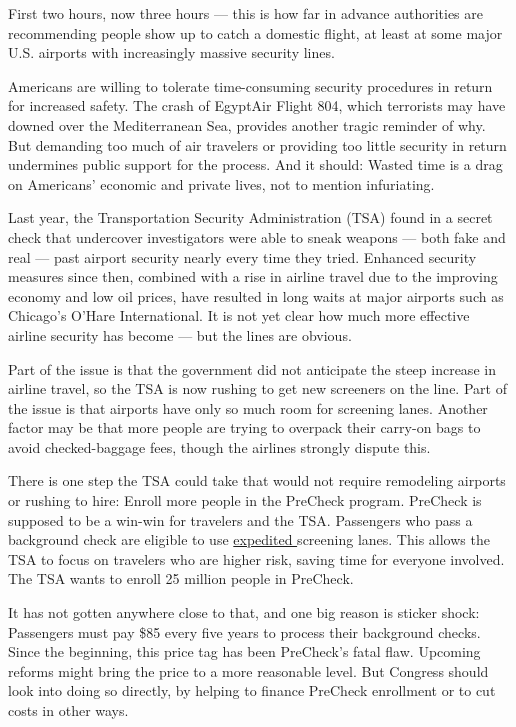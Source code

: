 \documentclass[UTF8,11pt]{ctexart}
\begin{document}
First two hours, now three hours — this is how far in advance authorities are recommending people show up to catch a domestic flight, at least at some major U.S. airports with increasingly massive security lines.


Americans are willing to tolerate time-consuming security procedures in return for increased safety. The crash of EgyptAir Flight 804, which terrorists may have downed over the Mediterranean Sea, provides another tragic reminder of why. But demanding too much of air travelers or providing too little security in return undermines public support for the process. And it should: Wasted time is a drag on Americans’ economic and private lives, not to mention infuriating.


Last year, the Transportation Security Administration (TSA) found in a secret check that undercover investigators were able to sneak weapons — both fake and real — past airport security nearly every time they tried. Enhanced security measures since then, combined with a rise in airline travel due to the improving economy and low oil prices, have resulted in long waits at major airports such as Chicago’s O’Hare International. It is not yet clear how much more effective airline security has become — but the lines are obvious.


Part of the issue is that the government did not anticipate the steep increase in airline travel, so the TSA is now rushing to get new screeners on the line. Part of the issue is that airports have only so much room for screening lanes. Another factor may be that more people are trying to overpack their carry-on bags to avoid checked-baggage fees, though the airlines strongly dispute this.


There is one step the TSA could take that would not require remodeling airports or rushing to hire: Enroll more people in the PreCheck program. PreCheck is supposed to be a win-win for travelers and the TSA. Passengers who pass a background check are eligible to use \uline{expedited }screening lanes. This allows the TSA to focus on travelers who are higher risk, saving time for everyone involved. The TSA wants to enroll 25 million people in PreCheck.


It has not gotten anywhere close to that, and one big reason is sticker shock: Passengers must pay \$85 every five years to process their background checks. Since the beginning, this price tag has been PreCheck’s fatal flaw. Upcoming reforms might bring the price to a more reasonable level. But Congress should look into doing so directly, by helping to finance PreCheck enrollment or to cut costs in other ways.
\end{document}

